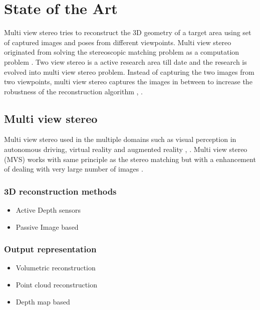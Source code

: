 

    \chapter{State of the Art}
	
	Multi view stereo tries to reconstruct the 3D geometry of a target area using set of captured images and poses from different viewpoints. Multi view stereo originated from solving the stereoscopic matching problem as a computation problem \cite{39_marr1979computational}. Two view stereo is a active research area till date and the research is evolved into multi view stereo problem. Instead of capturing the two images from two viewpoints, multi view stereo captures the images in between to increase the robustness of the reconstruction algorithm \cite{40_tsai1983multiframe}, \cite{41_okutomi1993multiple}.   
	
	\section{Multi view stereo}
	
	Multi view stereo used in the multiple domains such as visual perception in autonomous driving, virtual reality and augmented reality \cite{43_yildirim2019cybersickness}, \cite{44_chen2017multi}. Multi view stereo (MVS) works with same principle as the stereo matching but with a enhancement of dealing with very large number of images \cite{26_furukawa2009accurate}.   
	
	
	\subsection{3D reconstruction methods}
	\begin{itemize}
		\item Active
		Depth sensors 
		\item Passive
		Image based
	\end{itemize}

	\subsection{Output representation}
	\begin{itemize}
		\item Volumetric reconstruction
		\item Point cloud reconstruction
		\item Depth map based
	\end{itemize}
	
